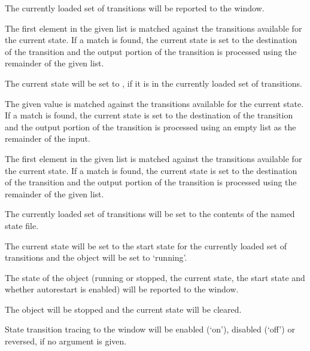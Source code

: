   The currently loaded set of transitions will be reported to the \MaxName{} window.

  The first element in the given list is matched against the transitions available for the
  current state.
  If a match is found, the current state is set to the destination of the transition and the
  output portion of the transition is processed using the remainder of the given list.

  The current state will be set to , if it is in the currently loaded set
  of transitions.

  The given value is matched against the transitions available for the current state.
  If a match is found, the current state is set to the destination of the transition and the
  output portion of the transition is processed using an empty list as the remainder of the input.

  The first element in the given list is matched against the transitions available for the
  current state.
  If a match is found, the current state is set to the destination of the transition and the
  output portion of the transition is processed using the remainder of the given list.

  The currently loaded set of transitions will be set to the contents of the named state file.

  The current state will be set to the start state for the currently loaded set of transitions
  and the  object will be set to `running'.

  The state of the  object (running or stopped, the current state, the start state
  and whether autorestart is enabled) will be reported to the \MaxName{} window.

  The  object will be stopped and the current state will be cleared.

  State transition tracing to the \MaxName{} window will be enabled (`on'), disabled (`off') or
  reversed, if no argument is given.
  
  \objListCmdEnd

\objItemFile[]

